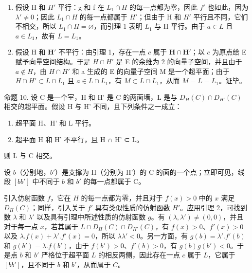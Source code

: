 \begin{enumerate}
\def\labelenumi{\alph{enumi})}
\item
  假设 H 和 \(H'\) 平行：g 和 f 在 \(L_{1} \cap H\) 的每一点都为零，因此 \(f'\) 也如此，因为 \(\lambda' \neq 0\)；因此 \(L_{1} \cap H\) 的每一点都属于 \(H'\)；但由于 H 和 \(H'\) 平行且不同，它们不相交，所以 \(L_{1} \cap H = \varnothing\)，而引理 1 表明 \(L_{1}\) 与 H 平行。由于 \(a \in L\) 且 \(a \in L_{1}\)，故有 \(L = L_{1}\)。
\item
  假设 H 和 \(\mathbf{H}'\) 不平行：由引理 1，存在一点 \(c\) 属于 \(\mathbf{H} \cap \mathbf{H}'\)；以 \(c\) 为原点给 E 赋予向量空间结构。于是 \(H \cap H'\) 是 E 的余维为 2 的向量子空间，并且由于 \(a \notin H\)，由 \(H \cap H'\) 和 a 生成的 E 的向量子空间 M 是一个超平面；由于 \(H \cap H' \subset L \cap L_1\) 且 \(a \in L \cap L_1\)，有 \(M \subset L \cap L_1\)，从而 \(M = L = L_1\)。证毕。
\end{enumerate}

命题 10. 设 C 是一个室，H 和 H' 是 C 的两面墙，L 是与 \(D_{H}(C) \cap D_{H'}(C)\) 相交的超平面。假设 H 与 H' 不同，且下列条件之一成立：

\begin{enumerate}
\def\labelenumi{\alph{enumi})}
\item
  超平面 H、H' 和 L 平行。
\item
  超平面 H 和 H' 不平行，且 H ∩ H' ⊂ L。
\end{enumerate}

则 L 与 C 相交。

设 \(b\)（分别地，\(b'\)）是支撑为 H（分别为 H'）的 C 的面的一个点；立即可见，线段 \([bb']\) 中不同于 \(b\) 和 \(b'\) 的每一点都属于 C。

引入仿射函数 \(f\)，它在 \(H\) 的每一点都为零，并且对于 \(f(x) > 0\) 中的 \(x\) 满足 \(D_H(C)\)；同样，引入关于 \(f'\) 具有类似性质的仿射函数 \(H'\)。应用引理 2，可找到数 \(\lambda\) 和 \(\lambda'\) 以及具有引理中所述性质的仿射函数 \(g\)。有 \((\lambda, \lambda') \neq (0, 0)\)，并且对于每一点 \(x\)，若其属于 \(L \cap D_H(C) \cap D_{H'}(C)\)，有 \(f(x) > 0\)、\(f'(x) > 0\) 以及 \(\lambda.f(x) + \lambda'.f'(x) = 0\)，所以 \(\lambda\lambda' < 0\)。另一方面，有 \(g(b) = \lambda'.f'(b)\) 和 \(g(b') = \lambda.f(b')\)，由于 \(f(b') > 0\)、\(f'(b) > 0\)，有 \(g(b)g(b') < 0\)。于是点 \(b\) 和 \(b'\) 严格位于超平面 \(L\) 的相反两侧，因此存在一点 \(c\) 属于 \(L\)，它属于 \([bb']\)，且不同于 \(b\) 和 \(b'\)，从而属于 \(C\)。

